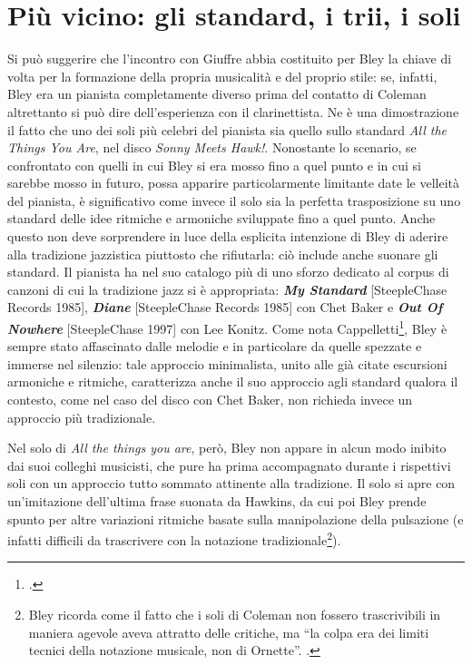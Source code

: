  \section{Più vicino: gli standard, i trii, i soli}
 Si può suggerire che l'incontro con Giuffre abbia costituito per Bley la chiave di volta per la formazione della propria musicalità e del proprio stile: se, infatti, Bley era un pianista completamente diverso prima del contatto di Coleman altrettanto si può dire dell'esperienza con il clarinettista. Ne è una dimostrazione il fatto che uno dei soli più celebri del pianista sia quello sullo standard \textit{All the Things You Are}, nel disco \textit{Sonny Meets Hawk!}. Nonostante lo scenario, se confrontato con quelli in cui Bley si era mosso fino a quel punto e in cui si sarebbe mosso in futuro, possa apparire particolarmente limitante date le velleità del pianista, è significativo come invece il solo sia la perfetta trasposizione su uno standard delle idee ritmiche e armoniche sviluppate fino a quel punto. Anche questo non deve sorprendere in luce della esplicita intenzione di Bley di aderire alla tradizione jazzistica piuttosto che rifiutarla: ciò include anche suonare gli standard. Il pianista ha nel suo catalogo più di uno sforzo dedicato al corpus di canzoni di cui la tradizione jazz si è appropriata: \textit{\textbf{My Standard}} [SteepleChase Records 1985], \textit{\textbf{Diane}} [SteepleChase Records 1985] con Chet Baker e \textit{\textbf{Out Of Nowhere}} [SteepleChase 1997] con Lee Konitz. Come nota Cappelletti\footcite[63]{cappelletti}, Bley è sempre stato affascinato dalle melodie e in particolare da quelle spezzate e immerse nel silenzio: tale approccio minimalista, unito alle già citate escursioni armoniche e ritmiche, caratterizza anche il suo approccio agli standard qualora il contesto, come nel caso del disco con Chet Baker, non richieda invece un approccio più tradizionale.\par
 Nel solo di \textit{All the things you are}, però, Bley non appare in alcun modo inibito dai suoi colleghi musicisti, che pure ha prima accompagnato durante i rispettivi soli con un approccio tutto sommato attinente alla tradizione. Il solo si apre con un'imitazione dell'ultima frase suonata da Hawkins, da cui poi Bley prende spunto per altre variazioni ritmiche basate sulla manipolazione della pulsazione (e infatti difficili da trascrivere con la notazione tradizionale\footnote{Bley ricorda come il fatto che i soli di Coleman non fossero trascrivibili in maniera agevole aveva attratto delle critiche, ma ``la colpa era dei limiti tecnici della notazione musicale, non di Ornette''. \cite[67]{stopping}.}).
